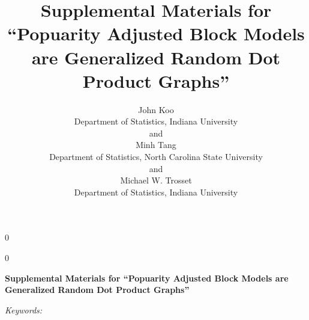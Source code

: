 \documentclass[12pt]{article}
\newcommand{\blind}{0}
\begin{document}
\def\spacingset#1{\renewcommand{\baselinestretch}%
{#1}\small\normalsize} \spacingset{1}



\blind
{
  \title{\bf Supplemental Materials for ``Popuarity Adjusted Block
Models are Generalized Random Dot Product Graphs''}

  \author{
        John Koo \\
    Department of Statistics, Indiana University\\
     and \\     Minh Tang \\
    Department of Statistics, North Carolina State University\\
     and \\     Michael W. Trosset \\
    Department of Statistics, Indiana University\\
      }
  \maketitle
} \fi

\blind
{
  \bigskip
  \bigskip
  \bigskip
  \begin{center}
    {\LARGE\bf Supplemental Materials for ``Popuarity Adjusted Block
Models are Generalized Random Dot Product Graphs''}
  \end{center}
  \medskip
} \fi

\bigskip
\begin{abstract}

\end{abstract}

\noindent%
{\it Keywords:} 
\vfill

\newpage
\spacingset{1.45} %

\newcommand{\diag}{\mathrm{diag}}
\newcommand{\tr}{\mathrm{Tr}}
\newcommand{\blockdiag}{\mathrm{blockdiag}}
\newcommand{\indep}{\stackrel{\mathrm{ind}}{\sim}}
\newcommand{\iid}{\stackrel{\mathrm{iid}}{\sim}}
\newcommand{\Bernoulli}{\mathrm{Bernoulli}}
\newcommand{\Betadist}{\mathrm{Beta}}
\newcommand{\BG}{\mathrm{BernoulliGraph}}
\newcommand{\PABM}{\mathrm{PABM}}
\newcommand{\RDPG}{\mathrm{RDPG}}
\newcommand{\GRDPG}{\mathrm{GRDPG}}
\newcommand{\Multinomial}{\mathrm{Multinomial}}
\newtheorem{theorem}{Theorem}
\newtheorem{lemma}{Lemma}
\newtheorem{proposition}{Proposition}
\newtheorem{remark}{Remark}
\newtheorem{definition}{Definition}
\newtheorem{example}{Example}
\end{document}
